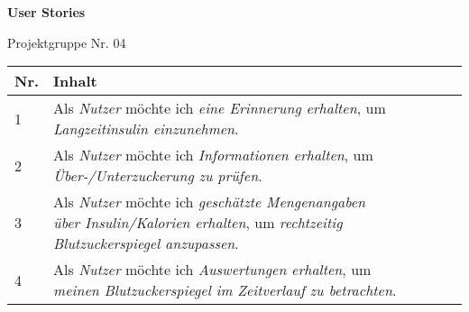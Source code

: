 \documentclass{article}
\begin{document}
\textbf{User Stories}

Projektgruppe Nr. 04
\vspace{1cm}

\begin{tabular}{|l|p{17cm}|c|c|c|c|}
  \hline
  \textbf{Nr.} & \textbf{Inhalt} \\
  \hline
  1 & Als \emph{Nutzer} möchte ich \emph{eine Erinnerung erhalten}, um \emph{Langzeitinsulin einzunehmen}.\\
  \hline
  2 & Als \emph{Nutzer} möchte ich \emph{Informationen erhalten}, um \emph{Über-/Unterzuckerung zu prüfen}.\\
  \hline
  3 & Als \emph{Nutzer} möchte ich \emph{geschätzte Mengenangaben über Insulin/Kalorien erhalten}, um \emph{rechtzeitig Blutzuckerspiegel anzupassen}.\\
  \hline
  4 & Als \emph{Nutzer} möchte ich \emph{Auswertungen erhalten}, um \emph{meinen Blutzuckerspiegel im Zeitverlauf zu betrachten}.\\
  \hline
\end{tabular}
\end{document}
